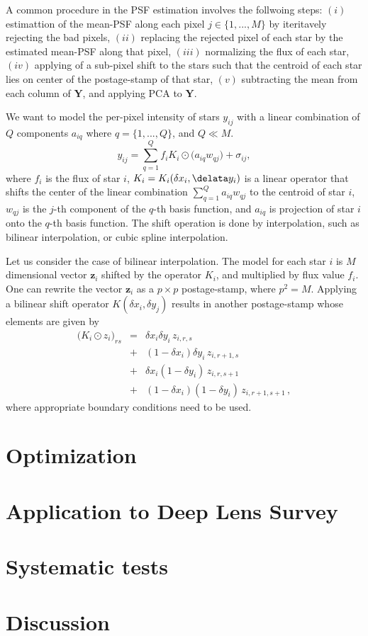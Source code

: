 \documentclass[12pt, preprint]{aastex}
\newcommand{\beq}{\begin{equation}}
\newcommand{\eeq}{\end{equation}}
\begin{document}
A common procedure in the PSF estimation involves the follwoing steps: $(i)$
estimattion of the mean-PSF along each pixel $j\in\{1,...,M\}$
by iteritavely rejecting the bad pixels, $(ii)$ replacing the rejected pixel of
each star by the estimated mean-PSF along that pixel, $(iii)$ 
normalizing the flux of each star, $(iv)$ applying of a sub-pixel shift
to the stars such that the centroid of each star lies on center 
of the postage-stamp of that star, $(v)$ subtracting the mean from each column
of $\mathbf{Y}$, and applying PCA to $\mathbf{Y}$.

We want to model the per-pixel intensity of stars $y_{ij}$ with a linear
combination of $Q$ components $a_{iq}$ where $q=\{1,...,Q\}$, and $Q\ll M$.
\beq
y_{ij} = \sum_{q=1}^{Q} f_{i}K_{i}\odot\big(a_{iq}w_{qj}\big) + \sigma_{ij},
\eeq
where $f_{i}$ is the flux of star $i$, $K_{i} = K_{i}(\delta x_{i} , \delata y_{i})$
is a linear operator that shifts the center of the linear combination
$\sum_{q=1}^{Q}a_{iq}w_{qj}$ to the centroid of star $i$, $w_{qj}$ is the 
$j$-th component of the $q$-th basis function, and $a_{iq}$ is projection
of star $i$ onto the $q$-th basis function. The shift
operation is done by interpolation, such as bilinear interpolation,
or cubic spline interpolation. 

Let us consider the case of bilinear interpolation. The model for each star
$i$ is $M$ dimensional vector $\mathbf{z}_{i}$ shifted by the operator $K_{i}$,
and multiplied by flux value $f_{i}$. One can rewrite the vector $\mathbf{z}_{i}$
as a $p\times p$ postage-stamp, where $p^{2}=M$.
Applying a bilinear shift operator $K(\delta x_{i} , \delta y_{j})$
results in another postage-stamp whose elements are given by
\begin{eqnarray}
\big(K_{i}\odot z_{i}\big)_{rs} &=& \delta x_{i} \delta y_{i} \, z_{i,r,s} \nonumber \\
                                &+& (1 - \delta x_{i}) \delta y_{i} \, z_{i,r+1,s} \nonumber \\ 
                                &+& \delta x_{i} (1-\delta y_{i}) \, z_{i,r,s+1} \nonumber \\ 
                                &+& (1 - \delta x_{i})(1-\delta y_{i}) \, z_{i,r+1,s+1} \, ,
\end{eqnarray}
where appropriate boundary conditions need to be used. 



\section{Optimization}\label{sec:opt}



\section{Application to Deep Lens Survey}\label{sec:data}
\section{Systematic tests}\label{sec:sys}
\section{Discussion}\label{sec:discussion} 
\end{document}
